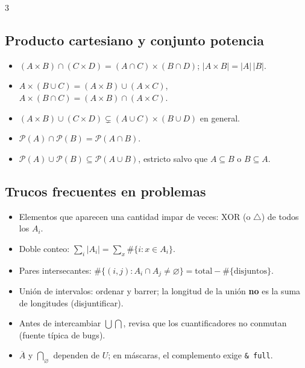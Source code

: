 \documentclass[8pt, spanish, mexico, letterpaper]{extarticle}
\newcommand{\<}{<}
\newcommand{\ov}[1]{\overline{#1}}
\newcommand{\sd}{\mathbin{\triangle}}
\newcommand{\Pw}{\mathcal{P}}
\newcommand{\card}[1]{\left|#1\right|}
\begin{document}
\begin{multicols*}{3}
\subsection{Producto cartesiano y conjunto potencia}
\begin{itemize}
  \item $(A\times B)\cap(C\times D)=(A\cap C)\times(B\cap D)$; \quad $\card{A\times B}=\card A\,\card B$.
  \item $A\times(B\cup C)=(A\times B)\cup(A\times C)$, \quad $A\times(B\cap C)=(A\times B)\cap(A\times C)$.
  \item $(A\times B)\cup(C\times D)\subsetneq(A\cup C)\times(B\cup D)$ en general.
  \item $\Pw(A)\cap\Pw(B)=\Pw(A\cap B)$.
  \item $\Pw(A)\cup\Pw(B)\subseteq\Pw(A\cup B)$, estricto salvo que $A\subseteq B$ o $B\subseteq A$.
\end{itemize}
 
\subsection{Trucos frecuentes en problemas}
\begin{itemize}
  \item Elementos que aparecen una cantidad impar de veces: XOR (o $\sd$) de todos los $A_i$.
  \item Doble conteo: $\sum_i\card{A_i}=\sum_x\#\{i:x\in A_i\}$.
  \item Pares intersecantes: $\#\{(i,j):A_i\cap A_j\ne\varnothing\}=\text{total}-\#\{\text{disjuntos}\}$.
  \item Uni\'on de intervalos: ordenar y barrer; la longitud de la uni\'on \textbf{no} es la suma de longitudes (disjuntificar).
  \item Antes de intercambiar $\bigcup\bigcap$, revisa que los cuantificadores no conmutan (fuente t\'ipica de bugs).
  \item $\ov A$ y $\bigcap_\varnothing$ dependen de $U$; en m\'ascaras, el complemento exige \texttt{\& full}.
\end{itemize}




\end{multicols*}
\end{document}
